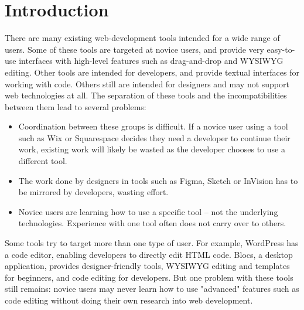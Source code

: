 \documentclass[conference, letterpaper]{IEEEtran}
\begin{document}
\section{Introduction}
There are many existing web-development tools intended for a wide range of users. Some of these tools are targeted at novice users, and provide very easy-to-use interfaces with high-level features such as drag-and-drop and WYSIWYG editing. Other tools are intended for developers, and provide textual interfaces for working with code. Others still are intended for designers and may not support web technologies at all. The separation of these tools and the incompatibilities between them lead to several problems:
\begin{itemize}
    \item Coordination between these groups is difficult. If a novice user using a tool such as Wix\cite{Wix} or Squarespace\cite{Squarespace} decides they need a developer to continue their work, existing work will likely be wasted as the developer chooses to use a different tool.
    \item The work done by designers in tools such as Figma\cite{Figma}, Sketch\cite{Sketch} or InVision\cite{InVision} has to be mirrored by developers, wasting effort.
    \item Novice users are learning how to use a specific tool -- not the underlying technologies. Experience with one tool often does not carry over to others.
\end{itemize}

Some tools try to target more than one type of user. For example, WordPress\cite{WordPress} has a code editor, enabling developers to directly edit HTML code. Blocs\cite{Blocs}, a desktop application, provides designer-friendly tools, WYSIWYG editing and templates for beginners, and code editing for developers. But one problem with these tools still remains: novice users may never learn how to use "advanced" features such as code editing without doing their own research into web development.
\end{document}
